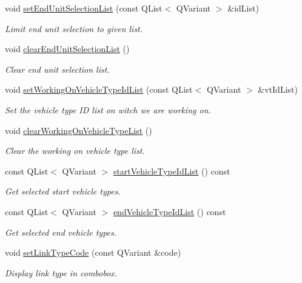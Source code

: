 \begin{DoxyCompactItemize}
void \hyperlink{classmdt_cl_unit_link_dialog_af4df48ddbeffce27bc9479ed36eb467a}{set\-End\-Unit\-Selection\-List} (const Q\-List$<$ Q\-Variant $>$ \&id\-List)
\begin{DoxyCompactList}\small\item\em Limit end unit selection to given list. \end{DoxyCompactList}\item 
void \hyperlink{classmdt_cl_unit_link_dialog_ac27cc9700c46dc37f810ddedcf843548}{clear\-End\-Unit\-Selection\-List} ()
\begin{DoxyCompactList}\small\item\em Clear end unit selection list. \end{DoxyCompactList}\item 
void \hyperlink{classmdt_cl_unit_link_dialog_a9a3bc3f1de4e3d7dc6bc090965ab7bbc}{set\-Working\-On\-Vehicle\-Type\-Id\-List} (const Q\-List$<$ Q\-Variant $>$ \&vt\-Id\-List)
\begin{DoxyCompactList}\small\item\em Set the vehicle type I\-D list on witch we are working on. \end{DoxyCompactList}\item 
void \hyperlink{classmdt_cl_unit_link_dialog_a35865311a515cd14f4d6b5d4830238a2}{clear\-Working\-On\-Vehicle\-Type\-List} ()
\begin{DoxyCompactList}\small\item\em Clear the working on vehicle type list. \end{DoxyCompactList}\item 
const Q\-List$<$ Q\-Variant $>$ \hyperlink{classmdt_cl_unit_link_dialog_a38fb21e39ed2f2e1d65a68a424895ac4}{start\-Vehicle\-Type\-Id\-List} () const 
\begin{DoxyCompactList}\small\item\em Get selected start vehicle types. \end{DoxyCompactList}\item 
const Q\-List$<$ Q\-Variant $>$ \hyperlink{classmdt_cl_unit_link_dialog_abe96eb187294372b022b2a8ba9c645b6}{end\-Vehicle\-Type\-Id\-List} () const 
\begin{DoxyCompactList}\small\item\em Get selected end vehicle types. \end{DoxyCompactList}\item 
void \hyperlink{classmdt_cl_unit_link_dialog_a34ab2fabffeb5b889be8db9ac08add22}{set\-Link\-Type\-Code} (const Q\-Variant \&code)
\begin{DoxyCompactList}\small\item\em Display link type in combobox. \end{DoxyCompactList}\item 

\end{DoxyCompactItemize}
